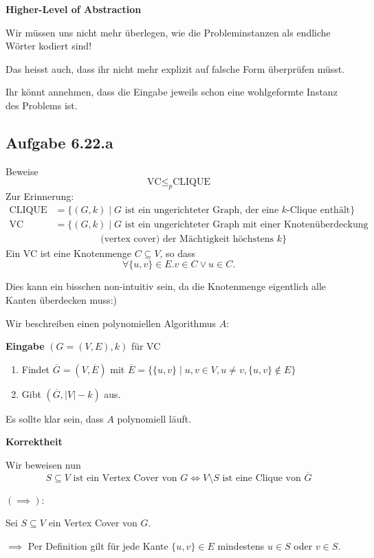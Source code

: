 \documentclass[a4paper, 11pt]{article}
\begin{document}
	\textbf{Higher-Level of Abstraction} 

	Wir müssen uns nicht mehr überlegen, wie die Probleminstanzen als endliche Wörter kodiert sind!

	
	Das heisst auch, dass ihr nicht mehr explizit auf falsche Form überprüfen müsst.

	Ihr könnt annehmen, dass die Eingabe jeweils schon eine wohlgeformte Instanz des Problems ist.


\subsection{Aufgabe 6.22.a}
	Beweise 
	$$\text{VC} \leq_p \text{CLIQUE}$$
	Zur Erinnerung:
	\begin{align*}
		\text{CLIQUE} &= \{(G, k) \mid G \text{ ist ein ungerichteter Graph, der eine $k$-Clique enthält}\}\\
		\text{VC} &= \{(G, k) \mid G \text{ ist ein ungerichteter Graph mit einer Knotenüberdeckung}\\ 
		 & \hspace{2cm}\text{(vertex cover) der Mächtigkeit höchstens }k\}
	\end{align*}
	Ein VC ist eine Knotenmenge $C \subseteq V$, so dass 
	$$\forall \{u, v\} \in E. v \in C \lor u \in C.$$

    Dies kann ein bisschen non-intuitiv sein, da die Knotenmenge eigentlich alle Kanten überdecken muss:)

	Wir beschreiben einen polynomiellen Algorithmus $A$:

	\textbf{Eingabe} $(G = (V, E), k)$ für VC
	\begin{enumerate}[label=\arabic*.]
		\item Findet $\overline{G} = (V, \overline{E})$ mit $\overline{E} = \{\{u, v\} \mid u, v \in V, u \neq v, \{u, v\} \notin E\}$
		\item Gibt $(\overline{G}, |V| - k)$ aus.
	\end{enumerate}
	Es sollte klar sein, dass $A$ polynomiell läuft.

	\textbf{Korrektheit}

	Wir beweisen nun 
	$$S \subseteq V \text{ ist ein Vertex Cover von }G \iff V\setminus S \text{ ist eine Clique von } \overline{G}$$

	$\mathbf{(\implies):}$

	Sei $S \subseteq V$ ein Vertex Cover von $G$. 
	
	
	$\implies$ Per Definition gilt für jede Kante $\{u, v\} \in E$ mindestens $u \in S$ oder $v \in S$.
		
\end{document}
